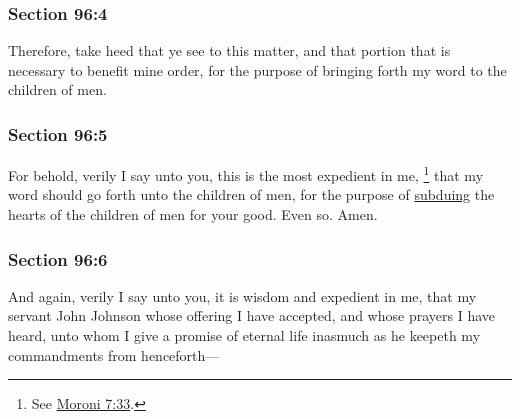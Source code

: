 	\subsubsection{Section 96:4} %
		\label{DC96-4}

		Therefore, take heed that ye see to this matter, and that portion that is necessary to benefit mine order, for the purpose of bringing forth my word to the children of men.


	\subsubsection{Section 96:5} %
		\label{DC96-5}

		For behold, verily I say unto you, this is the most expedient in me,%
			\footnote{%
				See \hyperref[MORONI-7-33]{Moroni 7:33}.
				}
		that my word should go forth unto the children of men, for the purpose of \hyperref[SUBDUE]{subduing} the hearts of the children of men for your good.  Even so.  Amen.


	\subsubsection{Section 96:6} %
		\label{DC96-6}

		And again, verily I say unto you, it is wisdom and expedient in me, that my servant John Johnson whose offering I have accepted, and whose prayers I have heard, unto whom I give a promise of eternal life inasmuch as he keepeth my commandments from henceforth—


